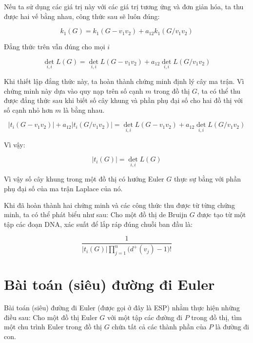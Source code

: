 \documentclass[14pt, a4paper]{article}
\numberwithin{equation}{section}
\numberwithin{figure}{section}
\numberwithin{dl}{section}
\numberwithin{md}{section}
\numberwithin{bd}{section}
\numberwithin{dn}{section}
\numberwithin{hq}{section}
\begin{document}
    Nếu ta sử dụng các giá trị này với các giá trị tương ứng và đơn giản hóa, ta thu được hai vế bằng nhau, công thức sau sẽ luôn đúng:

    \begin{equation}
        k_1 (G) = k_1 (G - v_1 v_2) + a_{12} k_1 (G / v_1 v_2)
    \end{equation}

    Đẳng thức trên vẫn đúng cho mọi $i$

    \begin{equation}
        \det_{i,i} L(G) = \det_{i, i} L (G - v_1 v_2) + a_{12} \det_{i, i} L (G/ v_1 v_2)
    \end{equation}

    Khi thiết lập đẳng thức này, ta hoàn thành chứng minh định lý cây ma trận.
    Vì chứng minh này dựa vào quy nạp trên số cạnh $m$ trong đồ thị $G$, ta có thể thu được đẳng thức sau khi biết số cây khung và phần phụ đại số cho hai đồ thị với số cạnh nhỏ hơn $m$ là bằng nhau.

    \begin{equation}
        \lvert t_i (G - v_1 v_2) \rvert + a_{12} \lvert t_i (G / v_1 v_2) \rvert = \det_{i, i} L(G - v_1 v_2) + a_{12} \det_{i, i} L (G / v_1 v_2)
    \end{equation}

    Vì vậy:

    \begin{equation}
        \lvert t_i (G) \rvert = \det_{i, i} L(G)
    \end{equation}

    Vì vậy số cây khung trong một đồ thị có hướng Euler $G$ thực sự bằng với phần phụ đại số của ma trận Laplace của nó.

    Khi đã hoàn thành hai chứng minh và các công thức thu được từ từng chứng minh, ta có thể phát biểu như sau:
    Cho một đồ thị de Bruijn $G$ được tạo từ một tập các đoạn DNA, xác suất để lắp ráp đúng chuỗi ban đầu là:

    \begin{equation}
        \dfrac{1}{\lvert t_i(G) \rvert \prod_{j=1}^n \big( d^+ (v_j) - 1 \big)!}
    \end{equation}

    \section{Bài toán (siêu) đường đi Euler}

    Bài toán (siêu) đường đi Euler (được gọi ở đây là ESP) nhằm thực hiện những điều sau:
    Cho một đồ thị Euler $G$ với một tập các đường đi $P$ trong đồ thị, tìm một chu trình Euler trong đồ thị $G$ chứa tất cả các thành phần của $P$ là đường đi con.
\end{document}
